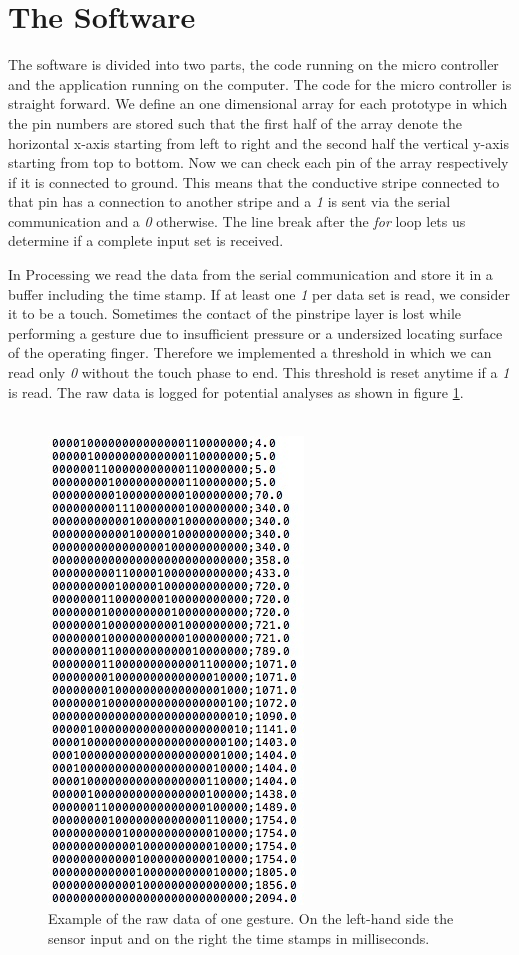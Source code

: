 \section{The Software}

The software is divided into two parts, the code running on the micro controller and the application running on the computer. The code for the micro controller is straight forward. We define an one dimensional array for each prototype in which the pin numbers are stored such that the first half of the array denote the horizontal x-axis starting from left to right and the second half the vertical y-axis starting from top to bottom. Now we can check each pin of the array respectively if it is connected to ground. This means that the conductive stripe connected to that pin has a connection to another stripe and a \emph{1} is sent via the serial communication and a \emph{0} otherwise. The line break after the \emph{for} loop lets us determine if a complete input set is received.

In Processing we read the data from the serial communication and store it in a buffer including the time stamp.  If at least one \emph{1} per data set is read, we consider it to be a touch. Sometimes the contact of the pinstripe layer is lost while performing a gesture due to insufficient pressure or a undersized locating surface of the operating finger. Therefore we implemented a threshold in which we can read only \emph{0} without the touch phase to end. This threshold is reset anytime if a \emph{1} is read. The raw data is logged for potential analyses as shown in figure \ref{fig:rawDataExample}.
\\ \\

\begin{figure}
\includegraphics[scale=0.7]{images/rawDataExample.jpg}
\caption{Example of the raw data of one gesture. On the left-hand side the sensor input and on the right the time stamps in milliseconds.}
\label{fig:rawDataExample}
\end{figure}

